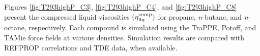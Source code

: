 \documentclass[preprint,review,12pt]{elsarticle}
\begin{document}
	Figures \ref{fig:T293highP_C3}, \ref{fig:T293highP_C4}, and \ref{fig:T293highP_C8} present the compressed liquid viscosities $(\eta_{\rm liq}^{\rm comp})$ for propane, \textit{n}-butane, and \textit{n}-octane, respectively. Each compound is simulated using the TraPPE, Potoff, and TAMie force fields at various densities. Simulation results are compared with REFPROP correlations and TDE data, when available. 
	
	
	
	
\end{document}

